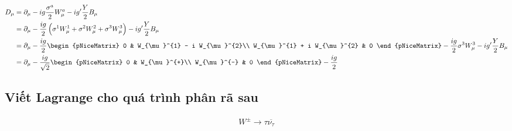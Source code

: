 \documentclass{report}
\newcommand{\f}[2]{\dfrac{#1}{#2}}
\begin{document}
\begin{align*}
	D_{\mu} 
	&= \partial_{\mu} - ig \f{\sigma^{a}}{2} W_{\mu}^{a} - ig'\f{Y}{2}B_{\mu}\\
	&= \partial_{\mu} - \f{ig}{2} \left( \sigma^{1}W_{\mu}^{1} + \sigma^{2}W_{\mu}^{2} + \sigma^{3}W_{\mu}^{3} \right) - ig' \f{Y}{2}B_{\mu}\\
	&= \partial_{\mu} - \f{ig}{2}
	\begin{pNiceMatrix}
		0 & W_{\mu}^{1} - i W_{\mu}^{2}\\
		W_{\mu}^{1} + i W_{\mu}^{2} & 0 
	\end{pNiceMatrix}
	- \f{ig}{2} \sigma^{3}W_{\mu}^{3} - ig' \f{Y}{2} B_{\mu}\\
	&= \partial_{\mu} - \f{ig}{\sqrt{2}} 
	\begin{pNiceMatrix}
		0 & W_{\mu}^{+}\\
		W_{\mu}^{-} & 0
	\end{pNiceMatrix}
	- \f{ig}{2}\
\end{align*}
\subsection*{Viết Lagrange cho quá trình phân rã sau}
\begin{align*}
	W^{\pm} \rightarrow \tau \overline{\nu_{\tau}}
\end{align*}
\end{document}
